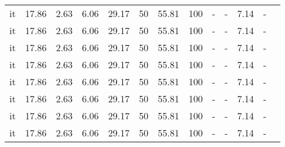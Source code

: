 \begin{table}[H]
\begin{tabularx}{\textwidth}{Xcccccccccccc}
            it & 17.86 & 2.63 & 6.06 & 29.17 & 50 & 55.81 & 100 & - & - & 7.14 & - \\
            it & 17.86 & 2.63 & 6.06 & 29.17 & 50 & 55.81 & 100 & - & - & 7.14 & - \\
            it & 17.86 & 2.63 & 6.06 & 29.17 & 50 & 55.81 & 100 & - & - & 7.14 & - \\
            it & 17.86 & 2.63 & 6.06 & 29.17 & 50 & 55.81 & 100 & - & - & 7.14 & - \\
            it & 17.86 & 2.63 & 6.06 & 29.17 & 50 & 55.81 & 100 & - & - & 7.14 & - \\
            it & 17.86 & 2.63 & 6.06 & 29.17 & 50 & 55.81 & 100 & - & - & 7.14 & - \\
            it & 17.86 & 2.63 & 6.06 & 29.17 & 50 & 55.81 & 100 & - & - & 7.14 & - \\
            it & 17.86 & 2.63 & 6.06 & 29.17 & 50 & 55.81 & 100 & - & - & 7.14 & - \\
        \bottomrule
    \end{tabularx}
\end{table}
    